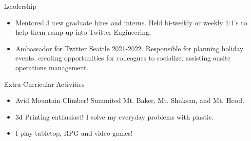 \begin{rSection}{Leadership} 
    \begin{itemize}
        \item Mentored 3 new graduate hires and interns. Held bi-weekly or weekly 1:1's to help them ramp up into Twitter Engineering.
        \item Ambassador for Twitter Seattle 2021-2022. Responsible for planning holiday events, creating opportunities for colleagues to socialize, assisting onsite operations management.
    \end{itemize}
\end{rSection}
\begin{rSection}{Extra-Curricular Activities} 
    \begin{itemize}
        \item Avid Mountain Climber! Summited Mt. Baker, Mt. Shuksan, and Mt. Hood. 
        \item 3d Printing enthusiast! I solve my everyday problems with plastic.
        \item I play tabletop, RPG and video games! 
    \end{itemize}
\end{rSection}


